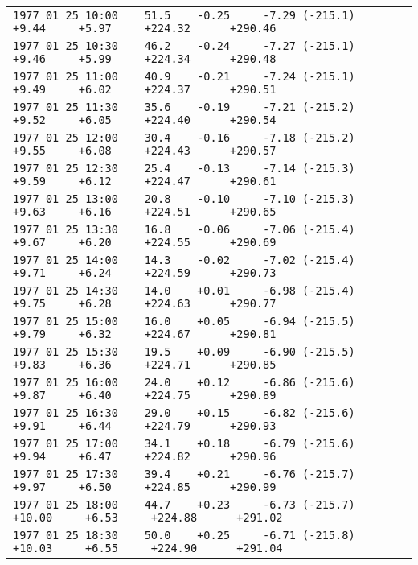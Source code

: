 \begin{center}
\begin{tabular}{|l|}
\verb|1977 01 25 10:00    51.5    -0.25     -7.29 (-215.1)      +9.44     +5.97     +224.32      +290.46|\\
\verb|1977 01 25 10:30    46.2    -0.24     -7.27 (-215.1)      +9.46     +5.99     +224.34      +290.48|\\
\verb|1977 01 25 11:00    40.9    -0.21     -7.24 (-215.1)      +9.49     +6.02     +224.37      +290.51|\\
\verb|1977 01 25 11:30    35.6    -0.19     -7.21 (-215.2)      +9.52     +6.05     +224.40      +290.54|\\
\verb|1977 01 25 12:00    30.4    -0.16     -7.18 (-215.2)      +9.55     +6.08     +224.43      +290.57|\\
\verb|1977 01 25 12:30    25.4    -0.13     -7.14 (-215.3)      +9.59     +6.12     +224.47      +290.61|\\
\verb|1977 01 25 13:00    20.8    -0.10     -7.10 (-215.3)      +9.63     +6.16     +224.51      +290.65|\\
\verb|1977 01 25 13:30    16.8    -0.06     -7.06 (-215.4)      +9.67     +6.20     +224.55      +290.69|\\
\verb|1977 01 25 14:00    14.3    -0.02     -7.02 (-215.4)      +9.71     +6.24     +224.59      +290.73|\\
\verb|1977 01 25 14:30    14.0    +0.01     -6.98 (-215.4)      +9.75     +6.28     +224.63      +290.77|\\
\verb|1977 01 25 15:00    16.0    +0.05     -6.94 (-215.5)      +9.79     +6.32     +224.67      +290.81|\\
\verb|1977 01 25 15:30    19.5    +0.09     -6.90 (-215.5)      +9.83     +6.36     +224.71      +290.85|\\
\verb|1977 01 25 16:00    24.0    +0.12     -6.86 (-215.6)      +9.87     +6.40     +224.75      +290.89|\\
\verb|1977 01 25 16:30    29.0    +0.15     -6.82 (-215.6)      +9.91     +6.44     +224.79      +290.93|\\
\verb|1977 01 25 17:00    34.1    +0.18     -6.79 (-215.6)      +9.94     +6.47     +224.82      +290.96|\\
\verb|1977 01 25 17:30    39.4    +0.21     -6.76 (-215.7)      +9.97     +6.50     +224.85      +290.99|\\
\verb|1977 01 25 18:00    44.7    +0.23     -6.73 (-215.7)     +10.00     +6.53     +224.88      +291.02|\\
\verb|1977 01 25 18:30    50.0    +0.25     -6.71 (-215.8)     +10.03     +6.55     +224.90      +291.04|\\

\end{tabular}
\end{center}
